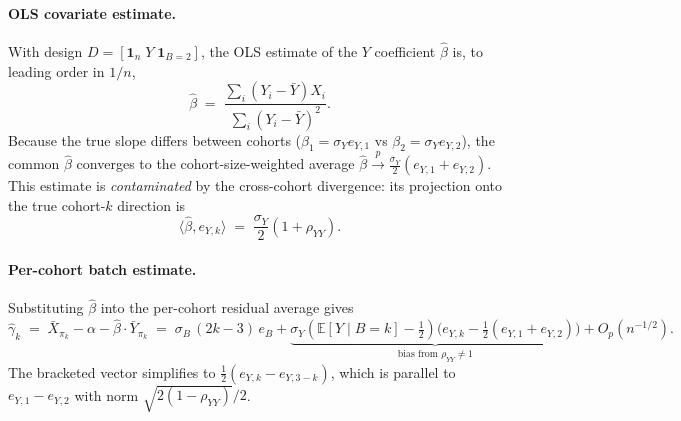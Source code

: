 \documentclass[11pt,a4paper]{article}
\newcommand{\E}{\mathbb{E}}
\begin{document}
\paragraph{OLS covariate estimate.}
With design $D=[\mathbf 1_n\;Y\;\mathbf 1_{B=2}]$, the OLS estimate
of the $Y$ coefficient $\hat\beta$ is, to leading order in $1/n$,
\begin{equation}
  \hat\beta \;=\; \frac{\sum_i (Y_i-\bar Y)X_i}{\sum_i(Y_i-\bar Y)^2}.
  \label{eq:betahat}
\end{equation}
Because the true slope differs between cohorts
($\beta_1=\sigma_Y e_{Y,1}$ vs $\beta_2=\sigma_Y e_{Y,2}$), the common
$\hat\beta$ converges to the cohort-size-weighted average
$\hat\beta \xrightarrow{p} \frac{\sigma_Y}{2}(e_{Y,1}+e_{Y,2})$.
This estimate is \emph{contaminated} by the cross-cohort divergence:
its projection onto the true cohort-$k$ direction is
\begin{equation}
  \langle\hat\beta, e_{Y,k}\rangle \;=\; \frac{\sigma_Y}{2}(1+\rho_{YY}).
  \label{eq:betahat-Yk}
\end{equation}

\paragraph{Per-cohort batch estimate.}
Substituting $\hat\beta$ into the per-cohort residual average gives
\[
  \hat\gamma_k \;=\; \bar X_{\pi_k} - \alpha - \hat\beta\cdot\bar Y_{\pi_k}
  \;=\; \sigma_B\,(2k{-}3)\,e_B
      + \underbrace{\sigma_Y(\E[Y\mid B=k]-\tfrac12)\bigl(e_{Y,k}-\tfrac12(e_{Y,1}+e_{Y,2})\bigr)}_{\text{bias from }\rho_{YY}\ne 1}
      + O_p(n^{-1/2}).
\]
The bracketed vector simplifies to $\tfrac12(e_{Y,k}-e_{Y,3-k})$,
which is parallel to $e_{Y,1}-e_{Y,2}$ with norm
$\sqrt{2(1-\rho_{YY})}/2$.
\end{document}
